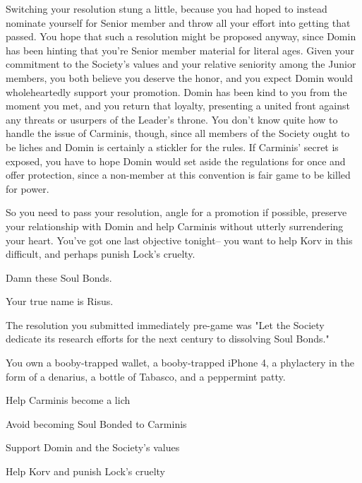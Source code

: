 \documentclass[char]{Sel}
\begin{document}
Switching your resolution stung a little, because you had hoped to instead nominate yourself for Senior member and throw all your effort into getting that passed. You hope that such a resolution might be proposed anyway, since Domin has been hinting that you're Senior member material for literal ages. Given your commitment to the Society's values and your relative seniority among the Junior members, you both believe you deserve the honor, and you expect Domin would wholeheartedly support your promotion.
Domin has been kind to you from the moment you met, and you return that loyalty, presenting a united front against any threats or usurpers of the Leader’s throne. You don't know quite how to handle the issue of Carminis, though, since all members of the Society ought to be liches and Domin is certainly a stickler for the rules. If Carminis' secret is exposed, you have to hope Domin would set aside the regulations for once and offer protection, since a non-member at this convention is fair game to be killed for power.

So you need to pass your resolution, angle for a promotion if possible, preserve your relationship with Domin and help Carminis without utterly surrendering your heart. You’ve got one last objective tonight-- you want to help Korv in this difficult, and perhaps punish Lock's cruelty.

Damn these Soul Bonds.


\begin{itemz}[Notes]
  \item Your true name is Risus.
  \item The resolution you submitted immediately pre-game was "Let the Society dedicate its research efforts for the next century to dissolving Soul Bonds."
   \item You own a booby-trapped wallet, a booby-trapped iPhone 4, a phylactery in the form of a denarius, a bottle of Tabasco, and a peppermint patty.
    \end{itemz}
    
  
 \begin{itemz}[Goals]
\item Help Carminis become a lich
\item Avoid becoming Soul Bonded to Carminis
\item Support Domin and the Society's values
\item Help Korv and punish Lock's cruelty
\end{itemz}
\end{document}
